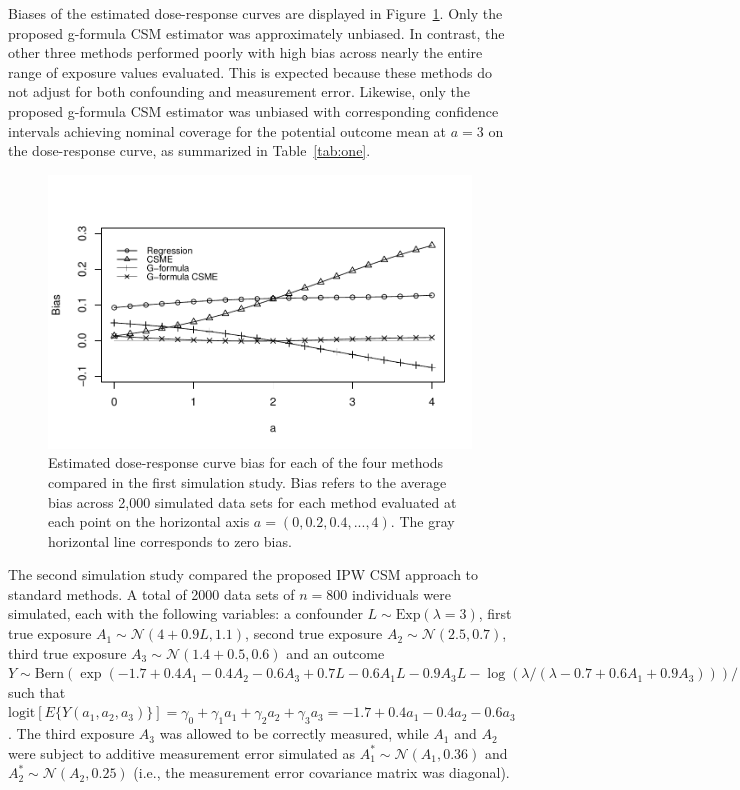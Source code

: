 \documentclass[useAMS,usenatbib,referee]{biom}
\begin{document}
Biases of the estimated dose-response curves are displayed in Figure~\ref{fig:two}. Only the proposed g-formula CSM estimator was approximately unbiased. In contrast, the other three methods performed poorly with high bias across nearly the entire range of exposure values evaluated. This is expected because these methods do not adjust for both confounding and measurement error. Likewise, only the proposed g-formula CSM estimator was unbiased with corresponding confidence intervals achieving nominal coverage for the potential outcome mean at $a = 3$ on the dose-response curve, as summarized in Table~\ref{tab:one}.

\begin{figure}
\centering
\includegraphics[width=6in]{paper1-fig2-grey.pdf}
\caption{Estimated dose-response curve bias for each of the four methods compared in the first simulation study. Bias refers to the average bias across 2,000 simulated data sets for each method evaluated at each point on the horizontal axis $a = (0, 0.2, 0.4, ..., 4)$. The gray horizontal line corresponds to zero bias.}
\label{fig:two}
\end{figure}

The second simulation study compared the proposed IPW CSM approach to standard methods. A total of 2000 data sets of $n = 800$ individuals were simulated, each with the following variables: a confounder $L \sim \text{Exp}(\lambda = 3)$, first true exposure $A_{1} \sim \mathcal{N}(4 + 0.9L, 1.1)$, second true exposure $A_{2} \sim \mathcal{N}(2.5, 0.7)$, third true exposure $A_{3} \sim \mathcal{N}(1.4 + 0.5, 0.6)$ and an outcome $Y \sim \text{Bern}(\exp(-1.7 + 0.4A_{1} - 0.4A_{2} - 0.6A_{3} + 0.7L - 0.6A_{1}L - 0.9A_{3}L - \log(\lambda / (\lambda - 0.7 + 0.6A_{1} + 0.9A_{3}))) / (1 + \exp(-1.7 + 0.4A_{1} - 0.4A_{2} - 0.6A_{3})))$ such that $\text{logit}[E\{ Y(a_{1}, a_{2}, a_{3})\} ] = \gamma_{0} + \gamma_{1}a_{1} + \gamma_{2}a_{2} + \gamma_{3}a_{3} = -1.7 + 0.4a_{1} - 0.4a_{2} - 0.6a_{3}$. The third exposure $A_{3}$ was allowed to be correctly measured, while $A_{1}$ and $A_{2}$ were subject to additive measurement error simulated as $A_{1}^{*} \sim \mathcal{N}(A_{1}, 0.36)$ and $A_{2}^{*} \sim \mathcal{N}(A_{2}, 0.25)$ (i.e., the measurement error covariance matrix was diagonal).
\end{document}
